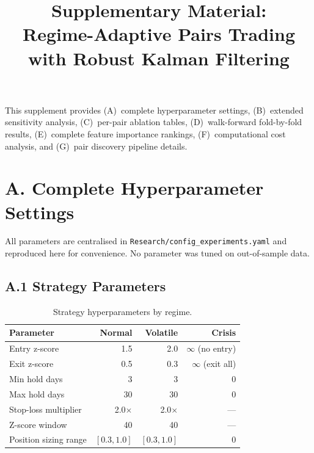 \documentclass[conference]{IEEEtran}
\begin{document}
\title{Supplementary Material:\\
Regime-Adaptive Pairs Trading with Robust Kalman Filtering}

\author{
}

\maketitle

\noindent This supplement provides (A)~complete hyperparameter settings,
(B)~extended sensitivity analysis, (C)~per-pair ablation tables,
(D)~walk-forward fold-by-fold results, (E)~complete feature importance
rankings, (F)~computational cost analysis, and (G)~pair discovery pipeline
details.

\section{A. Complete Hyperparameter Settings}
\label{sec:hyperparams}

All parameters are centralised in \texttt{Research/config\_experiments.yaml}
and reproduced here for convenience. No parameter was tuned on
out-of-sample data.

\subsection{A.1 Strategy Parameters}

\begin{table}[h]
\centering
\caption{Strategy hyperparameters by regime.}
\label{tab:supp_strategy}
\small
\begin{tabular}{lrrr}
\toprule
Parameter & Normal & Volatile & Crisis \\
\midrule
Entry z-score & 1.5 & 2.0 & $\infty$ (no entry) \\
Exit z-score & 0.5 & 0.3 & $\infty$ (exit all) \\
Min hold days & 3 & 3 & 0 \\
Max hold days & 30 & 30 & 0 \\
Stop-loss multiplier & 2.0$\times$ & 2.0$\times$ & --- \\
Z-score window & 40 & 40 & --- \\
Position sizing range & $[0.3, 1.0]$ & $[0.3, 1.0]$ & 0 \\
\bottomrule
\end{tabular}
\end{table}
\end{document}
